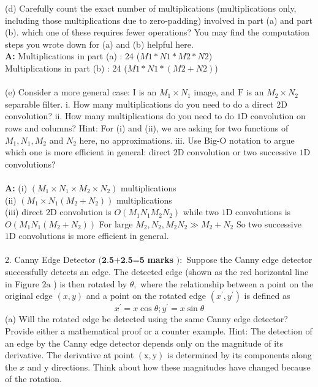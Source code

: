 \documentclass[english,a4paper,12pt]{article}
\begin{document}
\begin{enumerate}
{(d) Carefully count the exact number of multiplications (multiplications only, including those multiplications due to zero-padding) involved in part (a) and part (b). which one of these requires fewer operations? You may find the computation steps you wrote down for (a) and (b) helpful here. \\ 
\textbf{A:} Multiplications in part (a) : 24 ($M1*N1*M2*N2$)\\ 
Multiplications in part (b) : 24 ($M1*N1*(M2+N2)$)\\ ~\\
(e) Consider a more general case: I is an $M_{1} \times N_{1}$ image, and $\mathrm{F}$ is an $M_{2} \times N_{2}$ separable filter.
i. How many multiplications do you need to do a direct $2 \mathrm{D}$ convolution?
ii. How many multiplications do you need to do $1 \mathrm{D}$ convolution on rows and columns? Hint: For (i) and (ii), we are asking for two functions of $M_{1}, N_{1}, M_{2}$ and $N_{2}$ here, no approximations.
iii. Use Big-O notation to argue which one is more efficient in general: direct $2 \mathrm{D}$ convolution or two successive $1 \mathrm{D}$ convolutions?\\~\\
\textbf{A:} (i) $ (M_{1} \times N_{1} \times M_{2} \times N_{2})$ multiplications \\
(ii) $(M_{1} \times N_{1}\left(M_{2}+N_{2}\right))$ multiplications \\
(iii) direct $2 \mathrm{D}$ convolution is $O\left(M_{1} N_{1} M_{2} N_{2}\right)$
while two $1 \mathrm{D}$ convolutions is $O\left(M_{1} N_{1}\left(M_{2}+N_{2}\right)\right)$
For large $M_{2}, N_{2}, M_{2} N_{2} \gg M_{2}+N_{2}$
So two successive $1 \mathrm{D}$ convolutions is more efficient in general. \\~\\
2. Canny Edge Detector $(\textbf{2.5+2.5=5}$ \textbf{marks} $):$ Suppose the Canny edge detector successfully detects an edge. The detected edge (shown as the red horizontal line in Figure $2 \mathrm{a}$ ) is then rotated by $\theta,$ where the relationship between a point on the original edge $(x, y)$ and a point on the rotated edge $\left(x^{\prime}, y^{\prime}\right)$ is defined as
$$
x^{\prime}=x \cos \theta ; y^{\prime}=x \sin \theta
$$
(a) Will the rotated edge be detected using the same Canny edge detector? Provide either a mathematical proof or a counter example. Hint: The detection of an edge by the Canny edge detector depends only on the magnitude of its derivative. The derivative at point $(\mathrm{x}, \mathrm{y})$ is determined by its components along the $x$ and y directions. Think about how these magnitudes have changed because of the rotation. \\ 
}
\end{enumerate}
\end{document}

